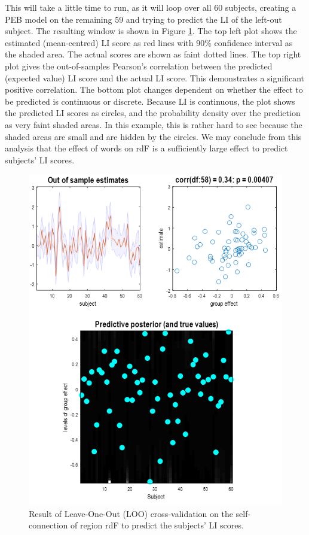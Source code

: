 \documentclass{article}
\begin{document}
This will take a little time to run, as it will loop over all 60 subjects, creating a PEB model on the remaining 59 and trying to predict the LI of the left-out subject. The resulting window is shown in Figure \ref{Fig_peb_loo_gui}. The top left plot shows the estimated (mean-centred) LI score as red lines with 90\% confidence interval as the shaded area. The actual scores are shown as faint dotted lines. The top right plot gives the out-of-samples Pearson's correlation between the predicted (expected value) LI score and the actual LI score. This demonstrates a significant positive correlation. The bottom plot changes dependent on whether the effect to be predicted is continuous or discrete. Because LI is continuous, the plot shows the predicted LI scores as circles, and the probability density over the prediction as very faint shaded areas. In this example, this is rather hard to see because the shaded areas are small and are hidden by the circles. We may conclude from this analysis that the effect of words on rdF is a sufficiently large effect to predict subjects' LI scores.

\begin{figure}[ht]
\begin{center}
\includegraphics{"Fig_peb_loo_gui"}
\caption{Result of Leave-One-Out (LOO) cross-validation on the self-connection of region rdF to predict the subjects' LI scores.\label{Fig_peb_loo_gui}}
\end{center}
\end{figure}
\end{document}
